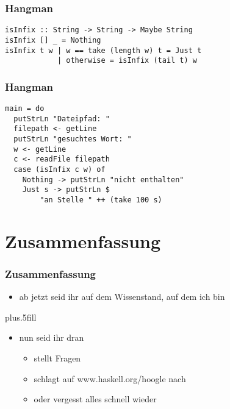 \begin{frame}[fragile]
\frametitle{Hangman}
\begin{lstlisting}
isInfix :: String -> String -> Maybe String
isInfix [] _ = Nothing
isInfix t w | w == take (length w) t = Just t
            | otherwise = isInfix (tail t) w
\end{lstlisting}	
\end{frame}

\begin{frame}[fragile]
\frametitle{Hangman}
\begin{lstlisting}
main = do
  putStrLn "Dateipfad: "
  filepath <- getLine
  putStrLn "gesuchtes Wort: "
  w <- getLine
  c <- readFile filepath
  case (isInfix c w) of
    Nothing -> putStrLn "nicht enthalten"
    Just s -> putStrLn $
        "an Stelle " ++ (take 100 s)
\end{lstlisting}	
\end{frame}

\section*{Zusammenfassung}

\begin{frame}
\frametitle{Zusammenfassung}

\begin{itemize}
  \item ab jetzt seid ihr auf dem Wissenstand, auf dem ich bin
\end{itemize}

\vskip0pt plus.5fill
\begin{itemize}
  \item nun seid ihr dran
  \begin{itemize}
    \item stellt Fragen
    \item schlagt auf www.haskell.org/hoogle nach 
    \item oder vergesst alles schnell wieder
  \end{itemize}
\end{itemize}
\end{frame}


